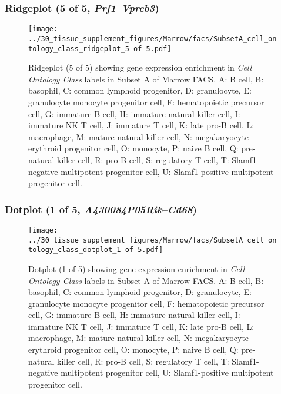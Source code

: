 \subsubsection{Ridgeplot (5 of 5, \emph{Prf1}--\emph{Vpreb3})}
\begin{figure}[h]
\centering
\texttt{[image: ../30\_tissue\_supplement\_figures/Marrow/facs/SubsetA\_cell\_ontology\_class\_ridgeplot\_5-of-5.pdf]}

\caption{ Ridgeplot (5 of 5)  showing gene expression enrichment in \emph{Cell Ontology Class} labels in Subset A of Marrow FACS. A: B cell, B: basophil, C: common lymphoid progenitor, D: granulocyte, E: granulocyte monocyte progenitor cell, F: hematopoietic precursor cell, G: immature B cell, H: immature natural killer cell, I: immature NK T cell, J: immature T cell, K: late pro-B cell, L: macrophage, M: mature natural killer cell, N: megakaryocyte-erythroid progenitor cell, O: monocyte, P: naive B cell, Q: pre-natural killer cell, R: pro-B cell, S: regulatory T cell, T: Slamf1-negative multipotent progenitor cell, U: Slamf1-positive multipotent progenitor cell.}
\end{figure}


\clearpage

\subsubsection{Dotplot (1 of 5, \emph{A430084P05Rik}--\emph{Cd68})}
\begin{figure}[h]
\centering
\texttt{[image: ../30\_tissue\_supplement\_figures/Marrow/facs/SubsetA\_cell\_ontology\_class\_dotplot\_1-of-5.pdf]}

\caption{ Dotplot (1 of 5)  showing gene expression enrichment in \emph{Cell Ontology Class} labels in Subset A of Marrow FACS. A: B cell, B: basophil, C: common lymphoid progenitor, D: granulocyte, E: granulocyte monocyte progenitor cell, F: hematopoietic precursor cell, G: immature B cell, H: immature natural killer cell, I: immature NK T cell, J: immature T cell, K: late pro-B cell, L: macrophage, M: mature natural killer cell, N: megakaryocyte-erythroid progenitor cell, O: monocyte, P: naive B cell, Q: pre-natural killer cell, R: pro-B cell, S: regulatory T cell, T: Slamf1-negative multipotent progenitor cell, U: Slamf1-positive multipotent progenitor cell.}
\end{figure}


\clearpage

